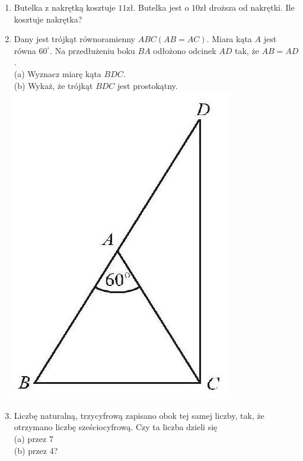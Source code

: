 \documentclass[10pt]{article}
\begin{document}
\begin{enumerate}
  \item Butelka z nakrętką kosztuje \(11 \mathrm{zł}\). Butelka jest o \(10 \mathrm{zł}\) droższa od nakrętki. Ile kosztuje nakrętka?
  \item Dany jest trójkąt równoramienny \(A B C(A B=A C)\). Miara kąta \(A\) jest równa \(60^{\circ}\). Na przedłużeniu boku \(B A\) odłożono odcinek \(A D\) tak, że \(A B=A D\).\\
(a) Wyznacz miarę kąta \(B D C\).\\
(b) Wykaż, że trójkąt \(B D C\) jest prostokątny.\\
\includegraphics[max width=\textwidth, center]{2024_11_21_6999515b00f050cfcacag-1}
  \item Liczbę naturalną, trzycyfrową zapisano obok tej samej liczby, tak, że otrzymano liczbę sześciocyfrową. Czy ta liczba dzieli się\\
(a) przez 7\\
(b) przez 4?
\end{enumerate}
\end{document}
